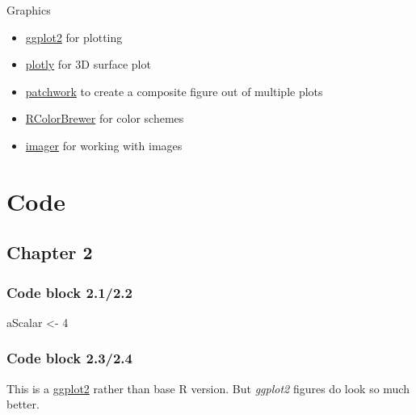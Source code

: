 \documentclass[
]{book}
\newenvironment{Shaded}{\begin{snugshade}}{\end{snugshade}}
\newcommand{\DecValTok}[1]{\textcolor[rgb]{0.00,0.00,0.81}{#1}}
\newcommand{\NormalTok}[1]{#1}
\newcommand{\StringTok}[1]{\textcolor[rgb]{0.31,0.60,0.02}{#1}}
\providecommand{\tightlist}{%
  \setlength{\itemsep}{0pt}\setlength{\parskip}{0pt}}
\begin{document}
Graphics

\begin{itemize}
\tightlist
\item
  \href{https://ggplot2.tidyverse.org/}{ggplot2} for plotting
\item
  \href{https://plotly.com/r/}{plotly} for 3D surface plot
\item
  \href{https://patchwork.data-imaginist.com/}{patchwork} to create a composite figure out of multiple plots
\item
  \href{https://rdrr.io/cran/RColorBrewer/}{RColorBrewer} for color schemes
\item
  \href{https://dahtah.github.io/imager/}{imager} for working with images
\end{itemize}

\hypertarget{code}{%
\chapter*{Code}\label{code}}

\hypertarget{chapter-2}{%
\section*{Chapter 2}\label{chapter-2}}

\hypertarget{code-block-2.12.2}{%
\subsection*{Code block 2.1/2.2}\label{code-block-2.12.2}}

\begin{Shaded}
\begin{Highlighting}[]
\NormalTok{aScalar \textless{}{-}}\StringTok{ }\DecValTok{4}
\end{Highlighting}
\end{Shaded}

\hypertarget{code-block-2.32.4}{%
\subsection*{Code block 2.3/2.4}\label{code-block-2.32.4}}

This is a \href{https://ggplot2.tidyverse.org/}{ggplot2} rather than base R version. But \emph{ggplot2} figures do look so much better.
\end{document}
